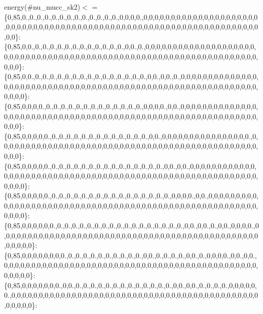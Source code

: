 energy(\#nu\+\_\+mucc\+\_\+sk2)$<$  = \{0,85,0.,0.,0.,0.,0.,0.,0.,0.,0.,0.,0.,0.,0.,0,0,0,0.,0,0,0,0,0,0,0,0,0,0,0,0,0,0,0,0,0,0,0,0,0,0,0,0,0,0,0,0,0,0,0,0,0,0,0,0,0,0,0,0,0,0,0,0,0,0,0,0,0,0,0,0,0,0,0,0,0,0,0,0,0,0,0,0,0,0,0,0,0\}\+: \{0,85,0,0.,0.,0.,0.,0.,0.,0.,0.,0.,0.,0.,0.,0.,0,0.,0.,0,0,0,0,0,0,0,0,0,0,0,0,0,0,0,0,0,0,0,0,0,0,0,0,0,0,0,0,0,0,0,0,0,0,0,0,0,0,0,0,0,0,0,0,0,0,0,0,0,0,0,0,0,0,0,0,0,0,0,0,0,0,0,0,0,0,0,0,0\}\+: \{0,85,0,0.,0.,0.,0.,0.,0.,0.,0.,0.,0.,0.,0.,0.,0.,0.,0.,0,0.,0,0.,0.,0,0,0,0,0,0,0,0,0,0,0,0,0,0,0,0,0,0,0,0,0,0,0,0,0,0,0,0,0,0,0,0,0,0,0,0,0,0,0,0,0,0,0,0,0,0,0,0,0,0,0,0,0,0,0,0,0,0,0,0,0,0,0,0\}\+: \{0,85,0,0,0,0.,0.,0.,0.,0.,0.,0.,0.,0.,0.,0.,0.,0.,0.,0,0,0,0.,0,0.,0,0,0,0,0,0,0,0,0,0,0,0,0,0,0,0,0,0,0,0,0,0,0,0,0,0,0,0,0,0,0,0,0,0,0,0,0,0,0,0,0,0,0,0,0,0,0,0,0,0,0,0,0,0,0,0,0,0,0,0,0,0,0\}\+: \{0,85,0,0,0,0,0.,0.,0.,0.,0.,0.,0.,0.,0.,0.,0.,0.,0.,0.,0,0.,0,0,0,0,0,0,0,0,0,0,0,0,0,0,0,0.,0,0,0,0,0,0,0,0,0,0,0,0,0,0,0,0,0,0,0,0,0,0,0,0,0,0,0,0,0,0,0,0,0,0,0,0,0,0,0,0,0,0,0,0,0,0,0,0,0,0\}\+: \{0,85,0,0,0,0,0.,0.,0.,0.,0.,0.,0.,0.,0.,0.,0.,0.,0.,0.,0.,0.,0,0.,0,0.,0,0,0,0,0,0,0,0,0,0,0,0,0,0,0,0,0,0,0,0,0,0,0,0,0,0,0,0,0,0,0,0,0,0,0,0,0,0,0,0,0,0,0,0,0,0,0,0,0,0,0,0,0,0,0,0,0,0,0,0,0,0\}\+: \{0,85,0,0,0,0,0.,0.,0.,0.,0.,0.,0.,0.,0.,0.,0.,0.,0.,0.,0.,0.,0.,0,0,0,0.,0,0.,0,0,0,0,0,0,0,0,0,0,0,0,0,0,0,0,0,0,0,0,0,0,0,0,0,0,0,0,0,0,0,0,0,0,0,0,0,0,0,0,0,0,0,0,0,0,0,0,0,0,0,0,0,0,0,0,0,0,0\}\+: \{0,85,0,0,0,0,0,0.,0.,0.,0.,0.,0.,0.,0.,0.,0.,0.,0.,0.,0.,0.,0.,0.,0.,0,0.,0,0.,0.,0,0.,0,0,0,0.,0,0,0,0,0,0,0,0,0,0,0,0,0,0,0,0,0,0,0,0,0,0,0,0,0,0,0,0,0,0,0,0,0,0,0,0,0,0,0,0,0,0,0,0,0,0,0,0,0,0,0,0\}\+: \{0,85,0,0,0,0,0,0,0,0.,0.,0.,0.,0.,0.,0.,0.,0.,0.,0.,0,0.,0.,0.,0.,0.,0,0.,0.,0,0,0,0.,0,0.,0,0.,0,0,0,0,0,0,0,0,0,0,0,0,0,0,0,0,0,0,0,0,0,0,0,0,0,0,0,0,0,0,0,0,0,0,0,0,0,0,0,0,0,0,0,0,0,0,0,0,0,0,0\}\+: \{0,85,0,0,0,0,0,0,0.,0,0.,0.,0.,0.,0.,0.,0.,0.,0.,0.,0.,0.,0.,0.,0,0.,0,0.,0.,0.,0.,0.,0,0,0,0,0,0.,0,0,0,0,0,0,0,0,0,0,0,0,0,0,0,0,0,0,0,0,0,0,0,0,0,0,0,0,0,0,0,0,0,0,0,0,0,0,0,0,0,0,0,0,0,0,0,0,0,0\}\+: 